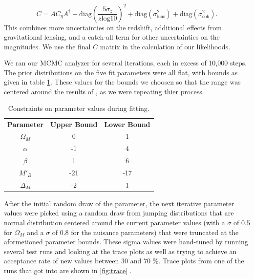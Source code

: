 \documentclass[aps,prl,reprint]{revtex4-1}
\begin{document}
$$C = A C_\eta A^\dagger + \text{diag}(\frac{5\sigma_z}{z \text{log} 10})^2 + \text{diag}(\sigma_\text{lens}^2) + \text{diag}(\sigma_{\text{coh}}^2). $$
This combines more uncertainties on the redshift, additional effects from gravitational lensing, and a catch-all term for other uncertainties on the magnitudes. We use the final $C$ matrix in the calculation of our likelihoods. 

\par We ran our MCMC analyzer for several iterations, each in excess of 10,000 steps. The prior distributions on the five fit parameters were all flat, with bounds as given in table \ref{bounds}. These values for the  bounds we choosen so that the range was centered around the results of \citep{sdss}, as we were repeating thier process.
\begin{table}
\begin{center}
\begin{tabular}{ |c|c|c| } 
 \hline
 \textbf{Parameter} & \textbf{Upper Bound} & \textbf{Lower Bound} \\ 
 $\Omega_M$ & 0 & 1 \\ 
 $\alpha$ & -1 & 4 \\ 
 $\beta$ & 1 & 6 \\ 
 $M'_B$ & -21 & -17 \\ 
$\Delta_M$ & -2 & 1 \\ 
 \hline
\end{tabular}
\caption{Constraints on parameter values during fitting.}\label{bounds}
\end{center}
\end{table}
	After the initial random draw of the parameter, the next iterative parameter values were picked using a random draw from jumping distributions that are normal distribution centered around the current parameter values (with a $\sigma$ of 0.5 for $\Omega_M$ and a $\sigma$ of 0.8 for the nuisance parameters) that were truncated at the aformetioned parameter bounds. These sigma values were hand-tuned by running several test runs and looking at the trace plots as well as trying to achieve an acceptance rate of new values between 30 and 70 \%. Trace plots from one of the runs that got into are shown in \cref{fig:trace} \cite{MC}. 
\end{document}

